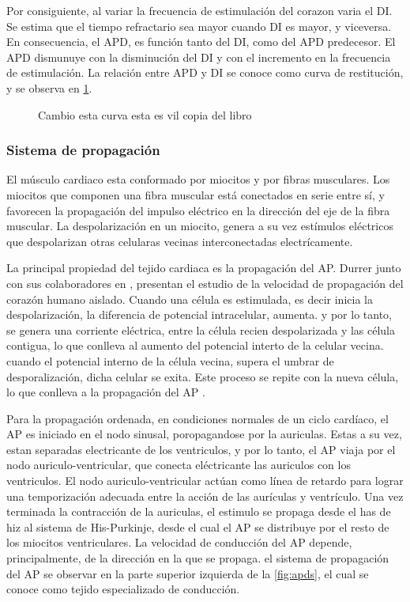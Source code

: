 Por consiguiente, al variar la frecuencia de estimulación del corazon
varia el \ac{DI}. Se estima que el tiempo refractario sea
mayor cuando \ac{DI} es mayor, y viceversa. En consecuencia,
el \ac{APD}, es función tanto del \ac{DI}, como del \ac{APD} predecesor.  El
\ac{APD} dismunuye con la disminución del \ac{DI} y con el incremento en la
frecuencia de estimulación. La relación entre \ac{APD} y \ac{DI} se conoce como
curva de restitución, y se observa en \ref{fig:curvares}.

\begin{figure}[t]
\centering
\caption{Cambio esta curva  esta es vil copia del libro }
  \label{fig:curvares}
\end{figure}

\subsubsection{Sistema de propagación }

El músculo cardiaco esta conformado por miocitos y por fibras
musculares. Los miocitos que componen una fibra muscular está conectados en
serie entre sí, y favorecen la propagación del impulso eléctrico en la
dirección del eje de la fibra muscular. La despolarización en un miocito, genera
a su vez estímulos eléctricos que despolarizan otras celularas vecinas interconectadas electrícamente.

La principal propiedad del tejido cardiaca  es la propagación del \ac{AP}.
Durrer junto con sus colaboradores en \cite{durrer1970}, presentan el estudio de
la velocidad de propagación del corazón humano aislado. Cuando una célula es
estimulada, es decir  inicia la despolarización, la diferencia de potencial
intracelular, aumenta. y por lo tanto, se genera una corriente eléctrica, entre
la célula recien despolarizada  y las célula contigua, lo que conlleva al
aumento del potencial interto de la celular vecina. cuando el potencial interno
de la célula vecina,  supera el umbrar de desporalización, dicha celular se
exita. Este proceso se repite con la nueva célula, lo que conlleva a la
propagación del \ac{AP} \cite{jalife2011}.

Para la propagación ordenada, en
condiciones normales de un ciclo cardíaco, el \ac{AP} es iniciado en el nodo
sinusal, poropagandose por la auriculas. Estas a su vez, estan separadas
electricante  de los ventriculos, y por lo tanto, el \ac{AP} viaja por el nodo
auriculo-ventricular, que conecta eléctricante las auriculos  con los
ventriculos. El nodo auriculo-ventricular actúan como línea de retardo para
lograr una temporización adecuada entre la acción de las aurículas y
ventrículo. Una vez terminada la contracción de la auriculas, el estimulo  se
propaga desde el has de hiz al sistema de His-Purkinje, desde el cual el
\ac{AP}  se distribuye por el resto de los miocitos  ventriculares. La velocidad
de conducción del \ac{AP} depende, principalmente, de la dirección en la que se
propaga. el sistema de propagación del \ac{AP} se observar en la parte superior
izquierda de la \ref{fig:apds}, el cual se conoce como tejido especializado de
conducción.

